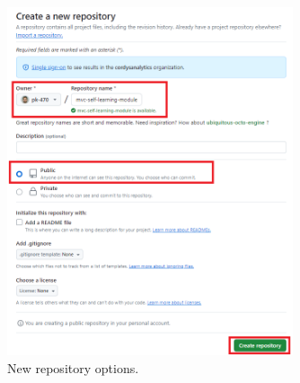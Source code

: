 \documentclass[a4paper,10pt]{article}
\begin{document}
\begin{figure}[htbp]
    \centering
    \includegraphics[width=0.75\textwidth]{new_repository_options.png}
    \caption{New repository options.}
    \label{fig:new_repository_options}   
\end{figure}
\end{document}
